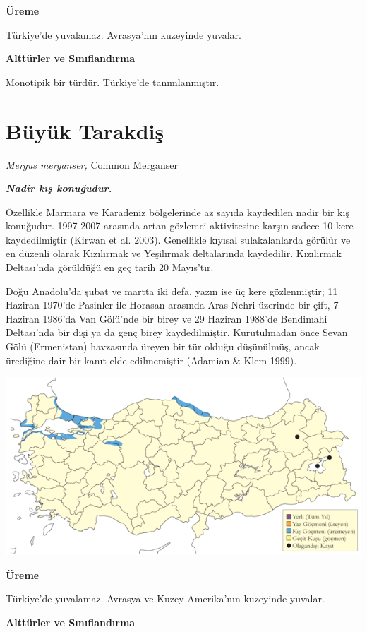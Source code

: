 \documentclass[
  letterpaper,
  DIV=11,
  numbers=noendperiod]{scrreprt}
\begin{document}
\textbf{Üreme}

Türkiye'de yuvalamaz. Avrasya'nın kuzeyinde yuvalar.

\textbf{Alttürler ve Sınıflandırma}

Monotipik bir türdür. Türkiye'de tanımlanmıştır.

\section{Büyük Tarakdiş}\label{buxfcyuxfck-tarakdiux15f}

\emph{Mergus merganser,} Common Merganser

\textbf{\emph{Nadir kış konuğudur.}}

Özellikle Marmara ve Karadeniz bölgelerinde az sayıda kaydedilen nadir
bir kış konuğudur. 1997-2007 arasında artan gözlemci aktivitesine karşın
sadece 10 kere kaydedilmiştir (Kirwan et al. 2003). Genellikle kıyısal
sulakalanlarda görülür ve en düzenli olarak Kızılırmak ve Yeşilırmak
deltalarında kaydedilir. Kızılırmak Deltası'nda görüldüğü en geç tarih
20 Mayıs'tır.

Doğu Anadolu'da şubat ve martta iki defa, yazın ise üç kere
gözlenmiştir; 11 Haziran 1970'de Pasinler ile Horasan arasında Aras
Nehri üzerinde bir çift, 7 Haziran 1986'da Van Gölü'nde bir birey ve 29
Haziran 1988'de Bendimahi Deltası'nda bir dişi ya da genç birey
kaydedilmiştir. Kurutulmadan önce Sevan Gölü (Ermenistan) havzasında
üreyen bir tür olduğu düşünülmüş, ancak ürediğine dair bir kanıt elde
edilmemiştir (Adamian \& Klem 1999).

\includegraphics{images/harita_Page_033.png}

\textbf{Üreme}

Türkiye'de yuvalamaz. Avrasya ve Kuzey Amerika'nın kuzeyinde yuvalar.

\textbf{Alttürler ve Sınıflandırma}
\end{document}
